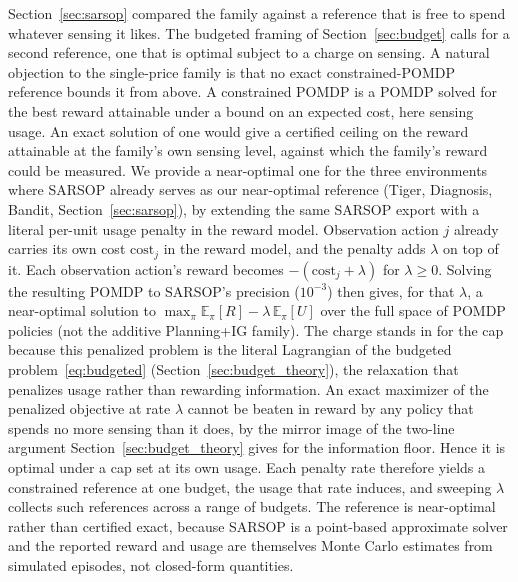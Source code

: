 Section~\ref{sec:sarsop} compared the family against a reference that is free to spend whatever sensing it likes. The budgeted framing of Section~\ref{sec:budget} calls for a second reference, one that is optimal subject to a charge on sensing. A natural objection to the single-price family is that no exact constrained-POMDP reference bounds it from above. A constrained POMDP is a POMDP solved for the best reward attainable under a bound on an expected cost, here sensing usage. An exact solution of one would give a certified ceiling on the reward attainable at the family's own sensing level, against which the family's reward could be measured. We provide a near-optimal one for the three environments where SARSOP already serves as our near-optimal reference (Tiger, Diagnosis, Bandit, Section~\ref{sec:sarsop}), by extending the same SARSOP export with a literal per-unit usage penalty in the reward model. Observation action $j$ already carries its own cost $\text{cost}_j$ in the reward model, and the penalty adds $\lambda$ on top of it. Each observation action's reward becomes $-(\text{cost}_j + \lambda)$ for $\lambda \ge 0$. Solving the resulting POMDP to SARSOP's precision ($10^{-3}$) then gives, for that $\lambda$, a near-optimal solution to $\max_\pi \mathbb{E}_\pi[R] - \lambda\,\mathbb{E}_\pi[U]$ over the full space of POMDP policies (not the additive Planning+IG family). The charge stands in for the cap because this penalized problem is the literal Lagrangian of the budgeted problem~\eqref{eq:budgeted} (Section~\ref{sec:budget_theory}), the relaxation that penalizes usage rather than rewarding information. An exact maximizer of the penalized objective at rate $\lambda$ cannot be beaten in reward by any policy that spends no more sensing than it does, by the mirror image of the two-line argument Section~\ref{sec:budget_theory} gives for the information floor. Hence it is optimal under a cap set at its own usage. Each penalty rate therefore yields a constrained reference at one budget, the usage that rate induces, and sweeping $\lambda$ collects such references across a range of budgets. The reference is near-optimal rather than certified exact, because SARSOP is a point-based approximate solver and the reported reward and usage are themselves Monte Carlo estimates from simulated episodes, not closed-form quantities.

